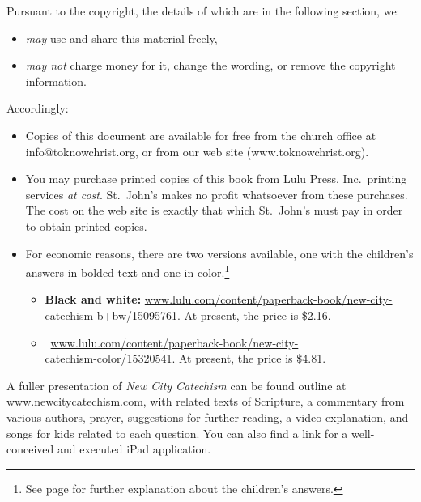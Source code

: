\documentclass[00-main.tex]{subfiles}
\begin{document}
Pursuant to the copyright, the details of which are in the following section, we:

\begin{itemize}
	\item {\em may}\/ use and share this material freely,
	\item {\em may not}\/ charge money for it, change the wording, or remove the copyright information.
\end{itemize}

Accordingly:

\begin{itemize}
\item Copies of this document are available for free from the church office at info@to\hspace{0em}know\hspace{0em}christ.\hspace{0em}org, or from our web site (www.to\hspace{0em}know\hspace{0em}christ.org).

\item You may purchase printed copies of this book from Lulu Press, Inc.\ printing services {\em at cost}. St.~John's makes no profit whatsoever from these purchases. The cost on the web site is exactly that which St.~John's must pay in order to obtain printed copies.

\item For economic reasons, there are two versions available, one with the children's answers in bolded text and one in color.\footnote{See page \pageref{whyversions} for further explanation about the children's answers.}
	\begin{itemize}
		\item \textbf{Black and white:} \href{http://www.lulu.com/content/paperback-book/new-city-catechism-b+bw/15095761}{www.lulu.com/content\slash{}paperback-book\slash{}new-city-catechism-b+bw\slash{}15095761}. At present, the price is \$2.16.
		
		\item {}\ \href{http://www.lulu.com/content/paperback-book/new-city-catechism-color/15320541}{www.lulu.com\slash{}content\slash{}paperback-book\slash{}new-city-\\catechism-color\slash{}15320541}. At present, the price is \$4.81.
	\end{itemize}
\end{itemize}

A fuller presentation of {\em New City Catechism\/} can be found outline at www.new\hspace{0em}city\hspace{0em}cat\hspace{0em}echism.\hspace{0em}com, with related texts of Scripture, a commentary from various authors, prayer, suggestions for further reading, a video explanation, and songs for kids related to each question. You can also find a link for a well-conceived and executed iPad application.
\end{document}
